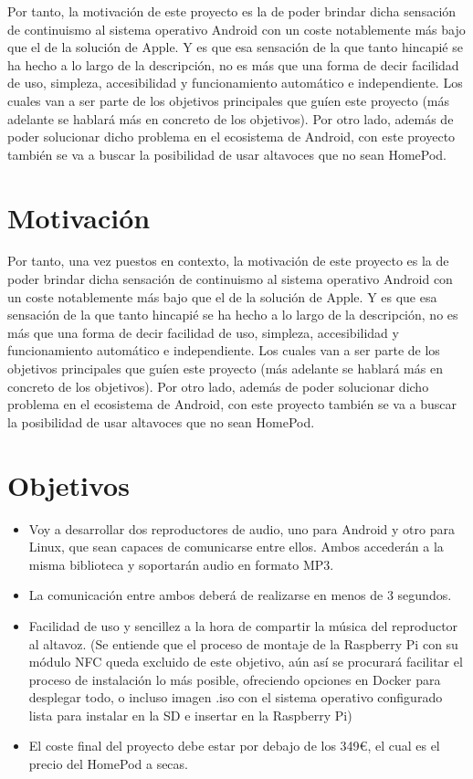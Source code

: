 Por tanto, la motivación de este proyecto es la de poder brindar dicha sensación de continuismo al sistema operativo Android con un coste notablemente más bajo que el de la solución de Apple. Y es que esa sensación de la que tanto hincapié se ha hecho a lo largo de la descripción, no es más que una forma de decir facilidad de uso, simpleza, accesibilidad y funcionamiento automático e independiente. Los cuales van a ser parte de los objetivos principales que guíen este proyecto (más adelante se hablará más en concreto de los objetivos). Por otro lado, además de poder solucionar dicho problema en el ecosistema de Android, con este proyecto también se va a buscar la posibilidad de usar altavoces que no sean HomePod.


\section{Motivación}
Por tanto, una vez puestos en contexto, la motivación de este proyecto es la de poder brindar dicha sensación de continuismo al sistema operativo Android con un coste notablemente más bajo que el de la solución de Apple. Y es que esa sensación de la que tanto hincapié se ha hecho a lo largo de la descripción, no es más que una forma de decir facilidad de uso, simpleza, accesibilidad y funcionamiento automático e independiente. Los cuales van a ser parte de los objetivos principales que guíen este proyecto (más adelante se hablará más en concreto de los objetivos). Por otro lado, además de poder solucionar dicho problema en el ecosistema de Android, con este proyecto también se va a buscar la posibilidad de usar altavoces que no sean HomePod. 

\section{Objetivos}
\begin{itemize}
    \item Voy a desarrollar dos reproductores de audio, uno para Android y otro para Linux, que sean capaces de comunicarse entre ellos. Ambos accederán a la misma biblioteca y soportarán audio en formato MP3.
    \item La comunicación entre ambos deberá de realizarse en menos de 3 segundos.
    \item Facilidad de uso y sencillez a la hora de compartir la música del reproductor al altavoz. (Se entiende que el proceso de montaje de la Raspberry Pi con su módulo NFC queda excluido de este objetivo, aún así se procurará facilitar el proceso de instalación lo más posible, ofreciendo opciones en Docker para desplegar todo, o incluso imagen .iso con el sistema operativo configurado lista para instalar en la SD e insertar en la Raspberry Pi)
    \item El coste final del proyecto debe estar por debajo de los 349€, el cual es el precio del HomePod a secas.
\end{itemize}

